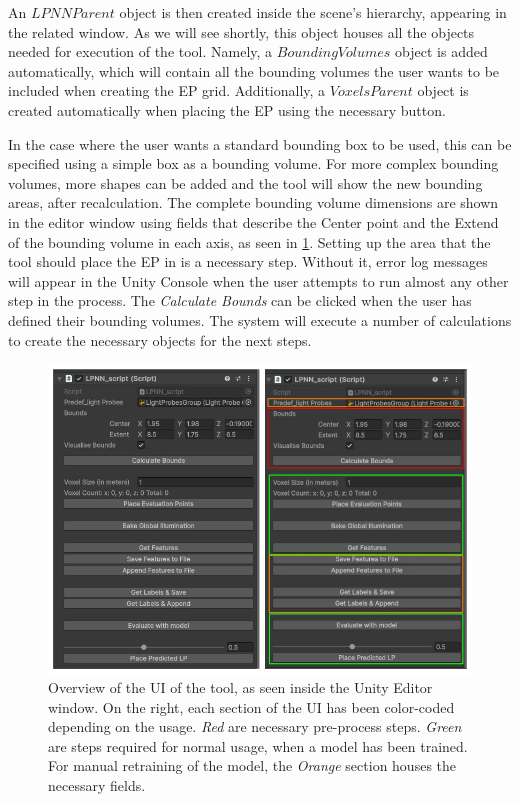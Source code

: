 An $LPNN Parent$ object is then created inside the scene's hierarchy, appearing in the related window. As we will see shortly, this object houses all the objects needed for execution of the tool. Namely, a $BoundingVolumes$ object is added automatically, which will contain all the bounding volumes the user wants to be included when creating the EP grid. Additionally, a $VoxelsParent$ object is created automatically when placing the EP using the necessary button. 

In the case where the user wants a standard bounding box to be used, this can be specified using a simple box as a bounding volume. For more complex bounding volumes, more shapes can be added and the tool will show the new bounding areas, after recalculation. The complete bounding volume dimensions are shown in the editor window using fields that describe the Center point and the Extend of the bounding volume in each axis, as seen in \ref{fig:UI_editor}. Setting up the area that the tool should place the EP in is a necessary step. Without it, error log messages will appear in the Unity Console when the user attempts to run almost any other step in the process. The \textit{Calculate Bounds} can be clicked when the user has defined their bounding volumes. The system will execute a number of calculations to create the necessary objects for the next steps.

\begin{figure}[h]
	\centering
	\includegraphics[scale=0.53]{Graphics/UI_parent_combined.png}
	\caption{Overview of the UI of the tool, as seen inside the Unity Editor window. On the right, each section of the UI has been color-coded depending on the usage. \textit{Red} are necessary pre-process steps. \textit{Green} are steps required for normal usage, when a model has been trained. For manual retraining of the model, the \textit{Orange} section houses the necessary fields.}
	\label{fig:UI_editor}
\end{figure}


